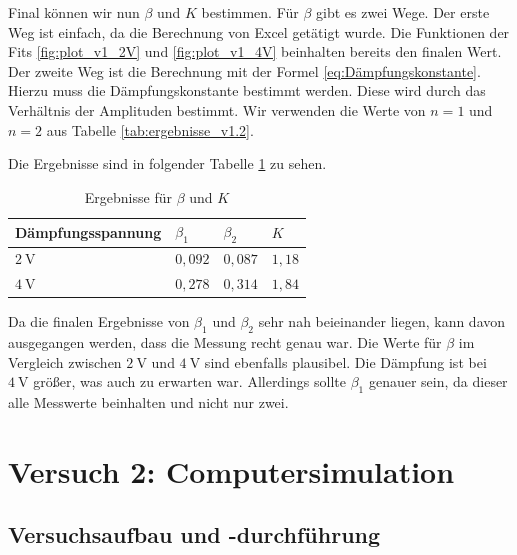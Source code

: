             Final können wir nun $\beta$ und $K$ bestimmen. Für $\beta$ gibt es zwei Wege. Der erste Weg ist einfach, da die Berechnung von Excel getätigt wurde. Die Funktionen der Fits \ref{fig:plot_v1_2V} und \ref{fig:plot_v1_4V} beinhalten bereits den finalen Wert. Der zweite Weg ist die Berechnung mit der Formel \ref{eq:Dämpfungskonstante}. Hierzu muss die Dämpfungskonstante bestimmt werden. Diese wird durch das Verhältnis der Amplituden bestimmt. Wir verwenden die Werte von $n = 1$ und $n = 2$ aus Tabelle \ref{tab:ergebnisse_v1.2}.

            Die Ergebnisse sind in folgender Tabelle \ref{tab:ergebnisse_v1.2_final} zu sehen.

            \begin{table}[H]
                \centering
                \caption{Ergebnisse für $\beta$ und $K$}
                \vspace{0.5em}
                \begin{tabular}{|l|l|l|l|}
                    \hline
                    Dämpfungsspannung & $\beta_{1}$& $\beta_{2}$ & $K$\\
                    \hline
                    \hline
                    $2\ \mathrm{V}$ & $0,092$ & $0,087$ & $1,18$\\
                    \hline
                    $4\ \mathrm{V}$ & $0,278$ & $0,314$ & $1,84$\\
                    \hline
                \end{tabular}
                \label{tab:ergebnisse_v1.2_final}
            \end{table}

            Da die finalen Ergebnisse von $\beta_{1}$ und $\beta_{2}$ sehr nah beieinander liegen, kann davon ausgegangen werden, dass die Messung recht genau war. Die Werte für $\beta$ im Vergleich zwischen $2\ \mathrm{V}$ und $4\ \mathrm{V}$ sind ebenfalls plausibel. Die Dämpfung ist bei $4\ \mathrm{V}$ größer, was auch zu erwarten war. Allerdings sollte $\beta_{1}$ genauer sein, da dieser alle Messwerte beinhalten und nicht nur zwei.

\newpage

\section{Versuch 2: Computersimulation}

    \subsection{Versuchsaufbau und -durchführung}

